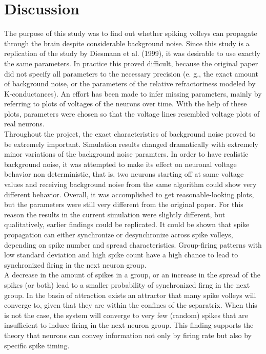 \documentclass[12pt,a4paper, bibliography=totoc, listof=numbered, footexclude]{scrartcl}
\begin{document}
  \section{Discussion}
  The purpose of this study was to find out whether spiking volleys can propagate through the brain despite considerable background noise. Since this study is a replication of the study by Diesmann et al. (1999), it was desirable to use exactly the same parameters. In practice this proved difficult, because the original paper did not specify all parameters to the necessary precision (e. g., the exact amount of background noise, or the parameters of the relative refractoriness modeled by K-conductances). An effort has been made to infer missing parameters, mainly by referring to plots of voltages of the neurons over time. With the help of these plots, parameters were chosen so that the voltage lines resembled voltage plots of real neurons.\\
  Throughout the project, the exact characteristics of background noise proved to be extremely important. Simulation results changed dramatically with extremely minor variations of the background noise paramters. In order to have realistic background noise, it was attempted to make its effect on neuronal voltage behavior non deterministic, that is, two neurons starting off at same voltage values and receiving background noise from the same algorithm could show very different behavior. Overall, it was accomplished to get reasonable-looking plots, but the parameters were still very different from the original paper. For this reason the results in the current simulation were slightly different, but qualitatively, earlier findings could be replicated. It could be shown that spike propagation can either synchronize or desynchronize across spike volleys, depending on spike number and spread characteristics. Group-firing patterns with low standard deviation and high spike count have a high chance to lead to synchronized firing in the next neuron group.\\
  A decrease in the amount of spikes in a group, or an increase in the spread of the spikes (or both) lead to a smaller probability of synchronized firng in the next group. In the  basin of attraction exists an attractor that many spike volleys will converge to, given that they are within the confines of the separatrix. When this is not the case, the system will converge to very few (random) spikes that are insufficient to induce firing in the next neuron group. This finding supports the theory that neurons can convey information not only by firing rate but also by specific spike timing. 
  
\end{document}
